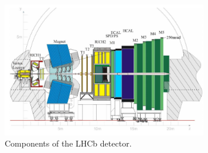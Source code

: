 \begin{figure}[!htb]
    \centering
    \includegraphics[width=0.8\textwidth]{graphics/lhcb.png}
    \caption{Components of the LHCb detector. \cite{sample_cpv}}
    \label{f1}
  \end{figure}










